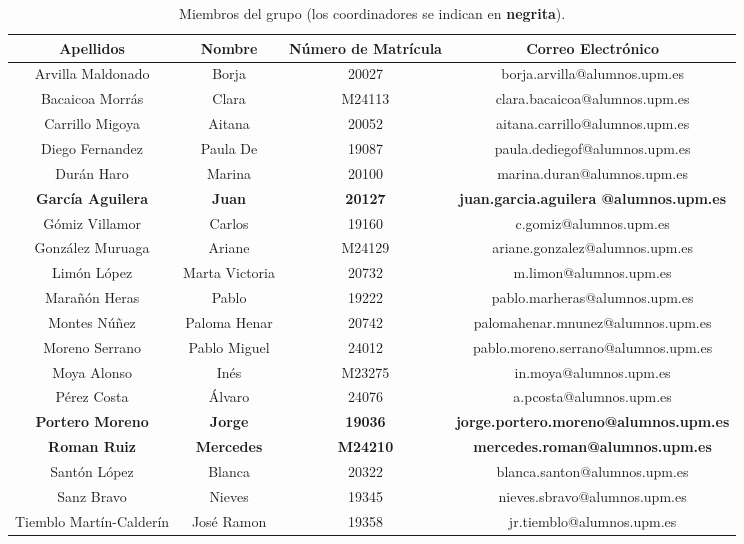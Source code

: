 \documentclass[10pt]{IEEEtran}
\begin{document}

\onecolumn

\begin{table}[h!]
    \centering
    \caption{Miembros del grupo (los coordinadores se indican en \textbf{negrita}).}
    \label{tab: Miembros}
    \begin{tabular}{|c|c|c|c|}
        \hline
        Apellidos & Nombre & Número de Matrícula & Correo Electrónico \\
        \hline
        Arvilla Maldonado & Borja & 20027 & borja.arvilla@alumnos.upm.es \\
        Bacaicoa Morrás & Clara & M24113 & clara.bacaicoa@alumnos.upm.es \\
        Carrillo Migoya & Aitana & 20052 & aitana.carrillo@alumnos.upm.es \\
        Diego Fernandez & Paula De & 19087 & paula.dediegof@alumnos.upm.es \\
        Durán Haro & Marina & 20100 & marina.duran@alumnos.upm.es \\
        \textbf{García Aguilera} & \textbf{Juan} & \textbf{20127} & \textbf{juan.garcia.aguilera @alumnos.upm.es} \\
        Gómiz Villamor & Carlos & 19160 & c.gomiz@alumnos.upm.es \\
        González Muruaga & Ariane & M24129 & ariane.gonzalez@alumnos.upm.es \\
        Limón López & Marta Victoria & 20732 & m.limon@alumnos.upm.es \\
        Marañón Heras & Pablo & 19222 & pablo.marheras@alumnos.upm.es \\
        Montes Núñez & Paloma Henar & 20742 & palomahenar.mnunez@alumnos.upm.es \\
        Moreno Serrano & Pablo Miguel & 24012 & pablo.moreno.serrano@alumnos.upm.es \\
        Moya Alonso & Inés & M23275 & in.moya@alumnos.upm.es \\
        Pérez Costa & Álvaro & 24076 & a.pcosta@alumnos.upm.es \\
        \textbf{Portero Moreno} & \textbf{Jorge} & \textbf{19036} & \textbf{jorge.portero.moreno@alumnos.upm.es} \\
        \textbf{Roman Ruiz} & \textbf{Mercedes} & \textbf{M24210} & \textbf{mercedes.roman@alumnos.upm.es} \\
        Santón López & Blanca & 20322 & blanca.santon@alumnos.upm.es \\
        Sanz Bravo & Nieves & 19345 & nieves.sbravo@alumnos.upm.es \\
        Tiemblo Martín-Calderín & José Ramon & 19358 & jr.tiemblo@alumnos.upm.es \\
        \hline
    \end{tabular}
\end{table}
\end{document}
